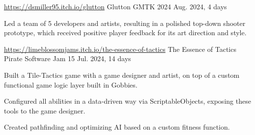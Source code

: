 

\begin{cventries}

  \cventry
   {\href{https://dsmiller95.itch.io/glutton}{https://dsmiller95.itch.io/glutton}} %
    {Glutton} %
    {GMTK 2024} %
    {Aug. 2024, 4 days} %
    {
      \begin{cvitems} %
        \item {Led a team of 5 developers and artists, resulting in a polished top-down shooter prototype, which received positive player feedback for its art direction and style.}
      \end{cvitems}
    }

  \cventry
   {\href{https://limeblossomjams.itch.io/the-essence-of-tactics}{https://limeblossomjams.itch.io/the-essence-of-tactics}} %
    {The Essence of Tactics} %
    {Pirate Software Jam 15} %
    {Jul. 2024, 14 days} %
    {
      \begin{cvitems} %
        \item {Built a Tile-Tactics game with a game designer and artist, on top of a custom functional game logic layer built in Gobbies.}
        \item {Configured all abilities in a data-driven way via ScriptableObjects, exposing these tools to the game designer.}
        \item {Created pathfinding and optimizing AI based on a custom fitness function.}
      \end{cvitems}
    }


\end{cventries}
